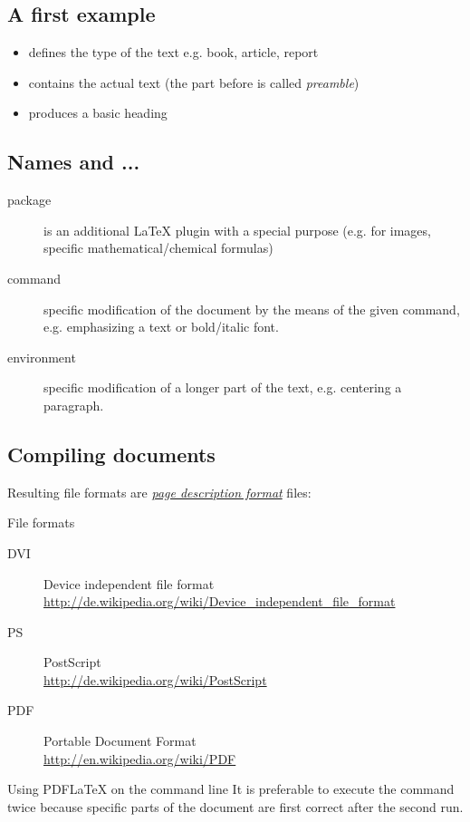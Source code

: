 \subsection{A first example}
\begin{frame}
	\begin{itemize}
		\item {} defines the type of the text e.g. book,
			article, report
		\item {} contains the actual text (the part
			before is called \emph{preamble})
		\item {} produces a basic heading
	\end{itemize}
\end{frame}
\subsection{Names and ...}
\begin{frame}
	\begin{description}
		\item[package] is an additional \LaTeX{} plugin with a special purpose
			(e.g. for images, specific mathematical/chemical formulas)
		\item[command] specific modification of the document by the means of
			the given command, e.g. emphasizing a text or bold/italic font.
		\item[environment] specific modification of a longer part of the text,
			e.g. centering a paragraph.
	\end{description}
\end{frame}



\subsection{Compiling documents}
\begin{frame}
	Resulting file formats are
	\href{http://en.wikipedia.org/wiki/Page_description_language}{\emph{page description
	format}} files:
	\begin{block}{File formats}
		\begin{description}
			\item[DVI] Device independent file format\\
				\url{http://de.wikipedia.org/wiki/Device_independent_file_format}
			\item[PS] PostScript\\
				\url{http://de.wikipedia.org/wiki/PostScript}
			\item[PDF] Portable Document Format\\
				\url{http://en.wikipedia.org/wiki/PDF}
		\end{description}
	\end{block}

	\begin{block}{Using PDFLaTeX on the command line}
		It is preferable to execute the command twice because specific parts
		of the document are first correct after the second run.
	\end{block}
\end{frame}
